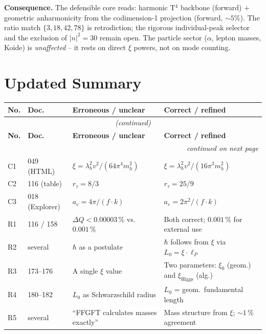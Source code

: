 \textbf{Consequence.} The defensible core reads: harmonic T$^4$ backbone
(forward) $+$ geometric anharmonicity from the codimension-1 projection
(forward, $\sim5\%$). The ratio match $\{3,18,42,78\}$ is retrodiction; the
rigorous individual-peak selector and the exclusion of $|n|^2=30$ remain open.
The particle sector ($\alpha$, lepton masses, Koide) is \emph{unaffected} -- it
rests on direct $\xi$ powers, not on mode counting.

\section*{Updated Summary}

{\scriptsize
\begin{longtable}{p{0.6cm}p{2.4cm}p{5.5cm}p{5.5cm}}
\toprule
\textbf{No.} & \textbf{Doc.} & \textbf{Erroneous / unclear} & \textbf{Correct / refined} \\
\midrule
\endfirsthead
\multicolumn{4}{c}{\scriptsize\emph{(continued)}}\\
\toprule
\textbf{No.} & \textbf{Doc.} & \textbf{Erroneous / unclear} & \textbf{Correct / refined} \\
\midrule
\endhead
\midrule
\multicolumn{4}{r}{\scriptsize\emph{continued on next page}}\\
\endfoot
\bottomrule
\endlastfoot
C1 & 049 (HTML) &
  $\xi = \lambda_h^2 v^2/(64\pi^4 m_h^2)$ &
  $\xi = \lambda_h^2 v^2/(16\pi^3 m_h^2)$ \\[3pt]
C2 & 116 (table) &
  $r_\tau = 8/3$ &
  $r_\tau = 25/9$ \\[3pt]
C3 & 018 (Explorer) &
  $a_e = 4\pi/(f \cdot k)$ &
  $a_e = 2\pi^2/(f \cdot k)$ \\[3pt]
R1 & 116 / 158 &
  $\Delta Q < 0.00003\,\%$ vs.\ $0.001\,\%$ &
  Both correct; $0.001\,\%$ for external use \\[3pt]
R2 & several &
  $\hbar$ as a postulate &
  $\hbar$ follows from $\xi$ via $L_0 = \xi\cdot\ell_P$ \\[3pt]
R3 & 173--176 &
  A single $\xi$ value &
  Two parameters: $\xi_0$ (geom.) and $\xi_{\text{Higgs}}$ (alg.) \\[3pt]
R4 & 180--182 &
  $L_0$ as Schwarzschild radius &
  $L_0$ = geom.\ fundamental length \\[3pt]
R5 & several &
  \enquote{FFGFT calculates masses exactly} &
  Mass structure from $\xi$; $\sim 1\,\%$ agreement \\[3pt]

\end{longtable}}
